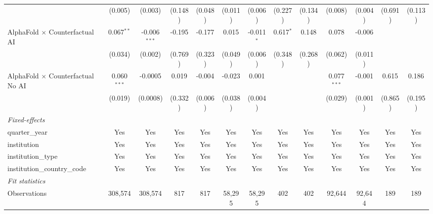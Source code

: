 \begin{tabular}{lcccccccccccc}
                                            & (0.005)       & (0.003)        & (0.148)      & (0.048) & (0.011)       & (0.006)       & (0.227)      & (0.134) & (0.008)       & (0.004)       & (0.691) & (0.113)\\   
   AlphaFold $\times$ Counterfactual AI     & 0.067$^{**}$  & -0.006$^{***}$ & -0.195       & -0.177  & 0.015         & -0.011$^{*}$  & 0.617$^{*}$  & 0.148   & 0.078         & -0.006        &         &   \\   
                                            & (0.034)       & (0.002)        & (0.769)      & (0.323) & (0.049)       & (0.006)       & (0.348)      & (0.268) & (0.062)       & (0.011)       &         &   \\   
   AlphaFold $\times$ Counterfactual No AI  & 0.060$^{***}$ & -0.0005        & 0.019        & -0.004  & -0.023        & 0.001         &              &         & 0.077$^{***}$ & -0.001        & 0.615   & 0.186\\   
                                            & (0.019)       & (0.0008)       & (0.332)      & (0.006) & (0.038)       & (0.004)       &              &         & (0.029)       & (0.001)       & (0.865) & (0.195)\\   
   \midrule
   \emph{Fixed-effects}\\
   quarter\_year                            & Yes           & Yes            & Yes          & Yes     & Yes           & Yes           & Yes          & Yes     & Yes           & Yes           & Yes     & Yes\\  
   institution                              & Yes           & Yes            & Yes          & Yes     & Yes           & Yes           & Yes          & Yes     & Yes           & Yes           & Yes     & Yes\\  
   institution\_type                        & Yes           & Yes            & Yes          & Yes     & Yes           & Yes           & Yes          & Yes     & Yes           & Yes           & Yes     & Yes\\  
   institution\_country\_code               & Yes           & Yes            & Yes          & Yes     & Yes           & Yes           & Yes          & Yes     & Yes           & Yes           & Yes     & Yes\\  
   \midrule
   \emph{Fit statistics}\\
   Observations                             & 308,574       & 308,574        & 817          & 817     & 58,295        & 58,295        & 402          & 402     & 92,644        & 92,644        & 189     & 189\\  

\end{tabular}
